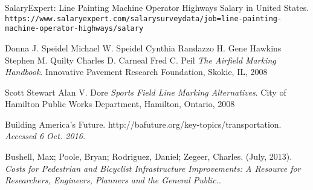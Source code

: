 \begin{thebibliography}

SalaryExpert: Line Painting Machine Operator Highways Salary in United States.
\\\texttt{https://www.salaryexpert.com/salarysurveydata/job=line-painting-machine-operator-highways/salary}

Donna J. Speidel
Michael W. Speidel
Cynthia Randazzo
H. Gene Hawkins
Stephen M. Quilty
Charles D. Carneal
Fred C. Peil
\textit{The Airfield Marking Handbook}.
Innovative Pavement Research Foundation, Skokie, IL, 2008

Scott Stewart
Alan V. Dore
\textit{Sports Field Line Marking Alternatives}.
City of Hamilton Public Works Department, Hamilton, Ontario, 2008

Building America's Future.
http://bafuture.org/key-topics/transportation. 
\textit{Accessed 6 Oct. 2016.}
 
Bushell, Max; Poole, Bryan; Rodriguez, Daniel; Zegeer, Charles. 
(July, 2013).
\textit{Costs for Pedestrian and Bicyclist Infrastructure Improvements: A Resource for Researchers, Engineers, Planners and the General Public.}. 

\end{thebibliography}
